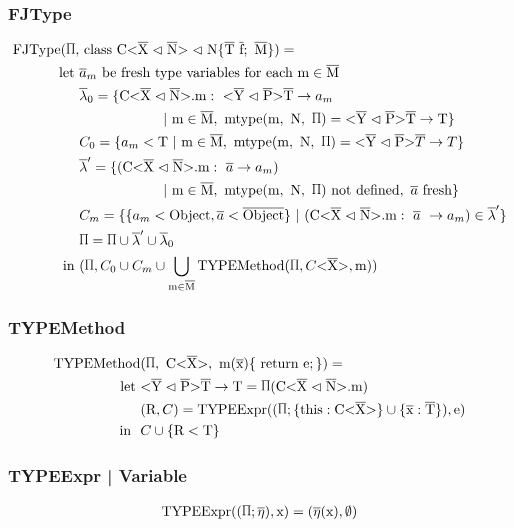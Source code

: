 \documentclass[aspectratio=169]{beamer}
\begin{document}
\begin{frame}[fragile]
    \frametitle{FJType}
    \begin{align*}
        \text{FJType}(\sprod{0.7}, & \ \classheader \{ \ot{T} \ \ot{f}; \ \ot{M} \}) = \\
        \text{let} \ & \overline{a}_m \ \text{be fresh type variables for each m} \in \ot{M} \\
        & \overline{\lambda}_0 = \{\cm : \ \yp \ot{T} \to a_m \\
        & \quad \quad \quad \quad \quad \quad | \ \text{m} \in \ot{M}, \ \mtype = \yp \ot{T} \to \text{T} \}\\
        & C_0 = \{ a_m < \text{T} \ | \ \text{m} \in \ot{M}, \ \mtype = \yp \oto{T} \}\\
        & \overline{\lambda}' = \{ ( \cm : \ \overline{a} \to a_m ) \\
        & \quad \quad \quad \quad \quad \quad | \ \text{m} \in \ot{M}, \ \mtype \ \text{not defined}, \ \fresh{\overline{a}} \}\\
        & C_m = \{\{ a_m < \text{Object}, \overline{a} < \ot{Object} \} \ | \ ( \cm : \ \overline{a} \ \to a_m) \in \overline{\lambda}' \} \\
        & \sprod{0.7} = \sprod{0.7} \cup \overline{\lambda}' \cup \overline{\lambda}_0\\
    \text{in} \ &(\sprod{0.7}, C_0 \cup C_m \cup \bigcup_{ \text{m} \in \ot{M} } \text{TYPEMethod}(\sprod{0.7}, C \vv{\ot{X}}, \text{m}))\\
    \end{align*}
\end{frame}

\begin{frame}[fragile]
    \frametitle{TYPEMethod}
    \begin{align*}
        \text{TYPEMethod}&(\sprod{0.7}, \ \text{C<} \ot{X} \text{>}, \ \text{m} ( \ot{x} ) \{ \ \text{return e}; \} ) = \\
        \text{let} \ &\yp \oto{\text{T}} = \sprod{0.7} ( \cm ) \\
        & ( \text{R}, C ) = \text{TYPEExpr} (( \sprod{0.7}; \{ \text{this} : \text{C<} \ot{X} \text{>} \} \cup \{ \ot{x} : \ot{T} \} ) , \text{e} ) \\
        \text{in} \ \  & C \cup \{ \text{R} < \text{T} \}\\
    \end{align*}
\end{frame}

\begin{frame}[fragile]
    \frametitle{TYPEExpr | Variable}
    \begin{align*}
        \texpr{\text{x}} = (\overline{\eta} (\text{x}), \emptyset)\\
    \end{align*}
\end{frame}
\end{document}
